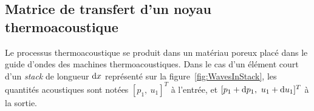 %
%

\subsection{Matrice de transfert d'un noyau thermoacoustique}
Le processus thermoacoustique se produit dans un matériau poreux placé dans le guide d'ondes des machines thermoacoustiques. Dans le cas d'un élément court d'un \textit{stack} de longueur $\mathrm{d} x$ représenté sur la figure~\ref{fig:WavesInStack}, les quantités acoustiques sont notées $[p_1,~u_1]^T$ à l'entrée, et $[p_1+\mathrm{d} p_1,~u_1+\mathrm{d} u_1]^T$ à la sortie.

